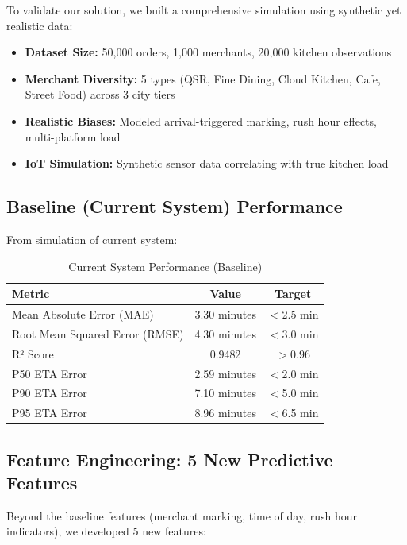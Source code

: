 \documentclass[11pt,a4paper]{article}
\begin{document}
To validate our solution, we built a comprehensive simulation using synthetic yet realistic data:

\begin{itemize}[leftmargin=*]
    \item \textbf{Dataset Size:} 50,000 orders, 1,000 merchants, 20,000 kitchen observations
    \item \textbf{Merchant Diversity:} 5 types (QSR, Fine Dining, Cloud Kitchen, Cafe, Street Food) across 3 city tiers
    \item \textbf{Realistic Biases:} Modeled arrival-triggered marking, rush hour effects, multi-platform load
    \item \textbf{IoT Simulation:} Synthetic sensor data correlating with true kitchen load
\end{itemize}

\subsection{Baseline (Current System) Performance}

From simulation of current system:

\begin{table}[H]
\centering
\caption{Current System Performance (Baseline)}
\begin{tabular}{@{}lcc@{}}
\toprule
\textbf{Metric} & \textbf{Value} & \textbf{Target} \\ \midrule
Mean Absolute Error (MAE) & 3.30 minutes & $<$2.5 min \\
Root Mean Squared Error (RMSE) & 4.30 minutes & $<$3.0 min \\
R² Score & 0.9482 & $>$0.96 \\
P50 ETA Error & 2.59 minutes & $<$2.0 min \\
P90 ETA Error & 7.10 minutes & $<$5.0 min \\
P95 ETA Error & 8.96 minutes & $<$6.5 min \\
\bottomrule
\end{tabular}
\label{tab:baseline}
\end{table}

\subsection{Feature Engineering: 5 New Predictive Features}

Beyond the baseline features (merchant marking, time of day, rush hour indicators), we developed 5 new features:
\end{document}
